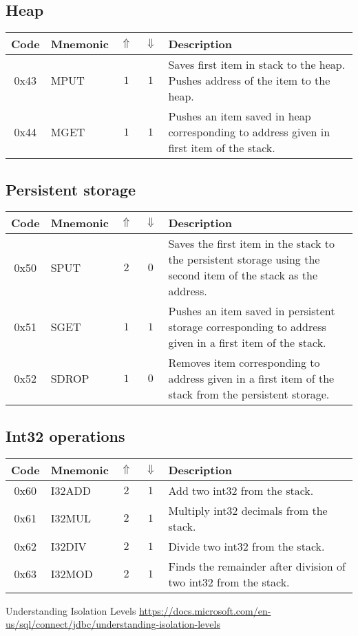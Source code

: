 \documentclass[12pt,a4paper]{article}
\begin{document}
\subsection{Heap}
\begin{tabularx}{\textwidth}{ c l c c p{7cm} }
\textbf{Code} & \textbf{Mnemonic} & \textbf{$\Uparrow$} & \textbf{$\Downarrow$} & \textbf{Description} \\
\hline
0x43 & MPUT & $1$ & $1$ & Saves first item in stack to the heap. Pushes address of the item to the heap. \\
\hline
0x44 & MGET & $1$ & $1$ & Pushes an item saved in heap corresponding to address given in first item of the stack.  \\
\hline
\end{tabularx}

\subsection{Persistent storage}
\begin{tabularx}{\textwidth}{ c l c c p{7cm} }
\textbf{Code} & \textbf{Mnemonic} & \textbf{$\Uparrow$} & \textbf{$\Downarrow$} & \textbf{Description} \\
\hline
0x50 & SPUT & $2$ & $0$ & Saves the first item in the stack to the persistent storage using the second item of the stack as the address.  \\
\hline
0x51 & SGET & $1$ & $1$ & Pushes an item saved in persistent storage corresponding to address given in a first item of the stack.  \\
\hline
0x52 & SDROP & $1$ & $0$ & Removes item corresponding to address given in a first item of the stack from the persistent storage.  \\
\hline
\end{tabularx}

\subsection{Int32 operations}
\begin{tabularx}{\textwidth}{ c l c c p{7cm} }
\textbf{Code} & \textbf{Mnemonic} & \textbf{$\Uparrow$} & \textbf{$\Downarrow$} & \textbf{Description} \\
\hline
0x60 & I32ADD & $2$ & $1$ & Add two int32 from the stack. \\
\hline
0x61 & I32MUL & $2$ & $1$ & Multiply int32 decimals from the stack. \\
\hline
0x62 & I32DIV & $2$ & $1$ & Divide two int32 from the stack. \\
\hline
0x63 & I32MOD & $2$ & $1$ & Finds the remainder after division of two int32 from the stack. \\
\hline
\end{tabularx}

\begin{thebibliography}{9}

 Understanding Isolation Levels \url{https://docs.microsoft.com/en-us/sql/connect/jdbc/understanding-isolation-levels}
\end{thebibliography}
\end{document}
